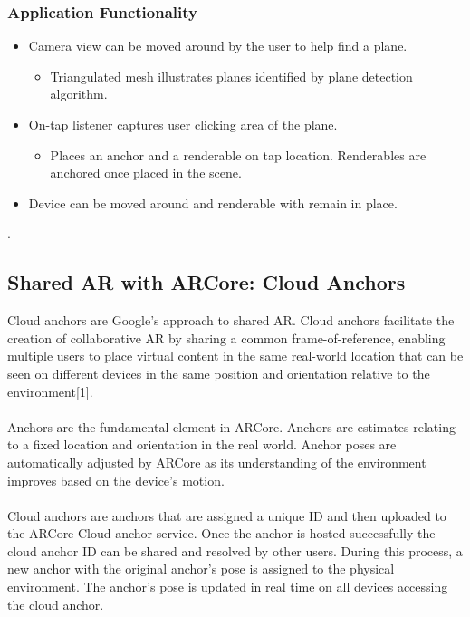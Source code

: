 \subsubsection{Application Functionality}
\begin{itemize}
    \item Camera view can be moved around by the user to help find a plane.
    \begin{itemize}
        \item Triangulated mesh illustrates planes identified by plane detection algorithm.
    \end{itemize}
    
    \item On-tap listener captures user clicking area of the plane.
    
    \begin{itemize}
        \item Places an anchor and a renderable on tap location. Renderables are anchored once placed in the scene.
    \end{itemize}
    
    \item Device can be moved around and renderable with remain in place.

\end{itemize}
. 


\subsection{Shared AR with ARCore: Cloud Anchors}

Cloud anchors are Google’s approach to shared AR. Cloud anchors facilitate the creation of collaborative AR by sharing a common frame-of-reference, enabling multiple users to place virtual content in the same real-world location that can be seen on different devices in the same position and orientation relative to the environment[1]. 
\\
\\
Anchors are the fundamental element in ARCore. Anchors are estimates relating to a fixed location and orientation in the real world. Anchor poses are automatically adjusted by ARCore as its understanding of the environment improves based on the device's motion.
\\ \\
Cloud anchors are anchors that are assigned a unique ID and then uploaded to the ARCore Cloud anchor service. Once the anchor is hosted successfully the cloud anchor ID can be shared and resolved by other users. During this process, a new anchor with the original anchor's pose is assigned to the physical environment. The anchor’s pose is updated in real time on all devices accessing the cloud anchor.

